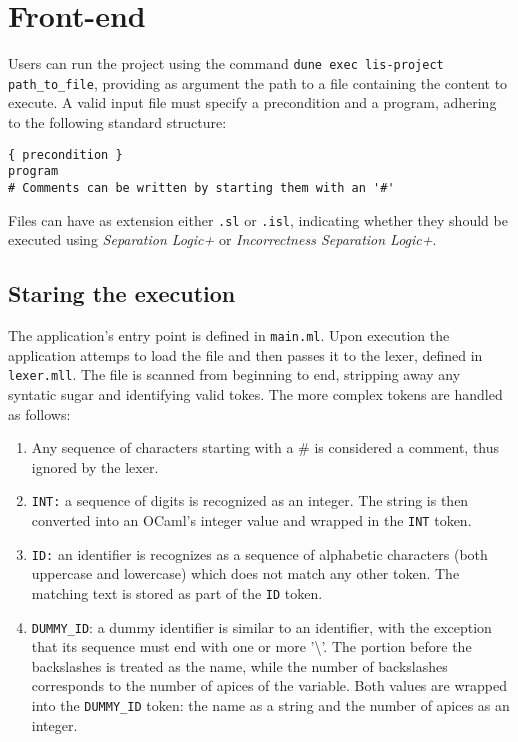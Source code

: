\documentclass[parskip=half]{scrartcl}
\begin{document}
\section{Front-end}
Users can run the project using the command \texttt{dune exec lis-project path\_to\_file},
providing as argument the path to a file containing the content to execute.
A valid input file must specify a precondition and a program, adhering to the following standard structure:

\begin{verbatim}
{ precondition }
program
# Comments can be written by starting them with an '#'
\end{verbatim}

Files can have as extension either \texttt{.sl} or \texttt{.isl}, 
indicating whether they should be executed using 
\textit{Separation Logic+} or \textit{Incorrectness Separation Logic+}.


\subsection{Staring the execution}
The application's entry point is defined in \texttt{main.ml}.
Upon execution the application attemps to load the file and then passes it to the lexer, defined in \texttt{lexer.mll}. 
The file is scanned from beginning to end, stripping away any syntatic sugar and identifying valid tokes.
The more complex tokens are handled as follows:

\begin{enumerate}
  \item Any sequence of characters starting with a \# is considered a comment, thus ignored by the lexer.
  
  \item \texttt{INT:} a sequence of digits is recognized as an integer. 
  The string is then converted into an OCaml's integer value and wrapped in the \texttt{INT} token.
      

  \item \texttt{ID:} an identifier is recognizes as a sequence of alphabetic characters (both uppercase and lowercase) which does not match any other token. 
        The matching text is stored as part of the \texttt{ID} token.
  
  \item \texttt{DUMMY\_ID}: a dummy identifier is similar to an identifier, with the exception that
        its sequence must end with one or more '\textbackslash{}'.
        The portion before the backslashes is treated as the name, while the number of backslashes corresponds to the number of apices of the variable.
        Both values are wrapped into the \texttt{DUMMY\_ID} token: the name as a string and the number of apices as an integer.
\end{enumerate}
\end{document}
